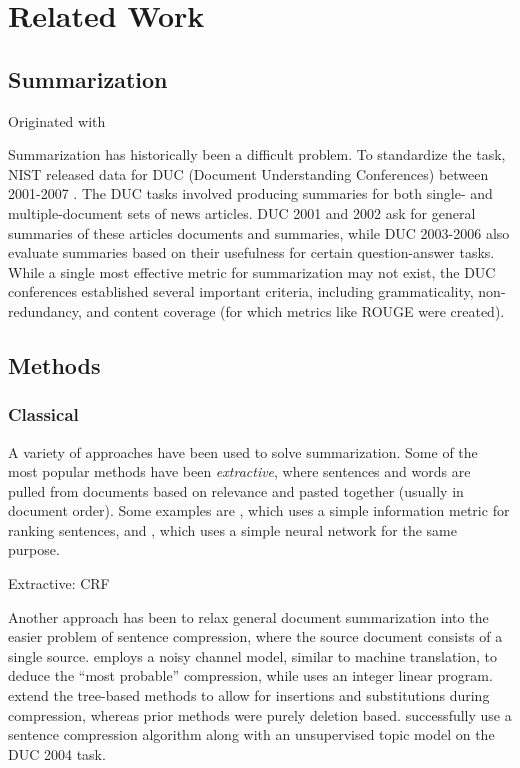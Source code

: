 \documentclass[11pt]{report}
\begin{document}

\chapter{Related Work}

\section{Summarization}

Originated with \cite{luhn1958automatic} %

Summarization has historically been a difficult problem. To standardize the task, NIST released data for DUC (Document Understanding Conferences) between 2001-2007 \citep{over2007duc}. The DUC tasks involved producing summaries for both single- and multiple-document sets of news articles. DUC 2001 and 2002 ask for general summaries of these articles documents and summaries, while DUC 2003-2006 also evaluate summaries based on their usefulness for certain question-answer tasks. While a single most effective metric for summarization may not exist, the DUC conferences established several important criteria, including grammaticality, non-redundancy, and content coverage (for which metrics like ROUGE \citep{lin2004rouge} were created).

\section{Methods}

\subsection{Classical}

A variety of approaches have been used to solve summarization. Some of the most popular methods have been \emph{extractive}, where sentences and words are pulled from documents based on relevance and pasted together (usually in document order). Some examples are \cite{carbonell1998MMR}, which uses a simple information metric for ranking sentences, and \cite{svore2007ranknet}, which uses a simple neural network for the same purpose.

Extractive: CRF \cite{Shen2004}

Another approach has been to relax general document summarization into the easier problem of sentence compression, where the source document consists of a single source. \cite{knight2002summarization} employs a noisy channel model, similar to machine translation, to deduce the ``most probable'' compression, while \cite{clarke2008global} uses an integer linear program. \cite{cohn2008sentence} extend the tree-based methods to allow for insertions and substitutions during compression, whereas prior methods were purely deletion based. \cite{zajic2004topiary} successfully use a sentence compression algorithm along with an unsupervised topic model on the DUC 2004 task.
\end{document}
